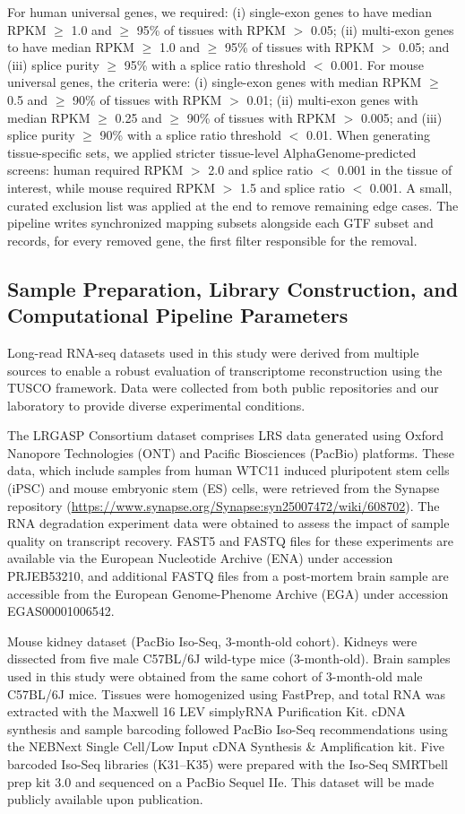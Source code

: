 \documentclass[pdflatex,sn-nature]{sn-jnl}%
\begin{document}
For human universal genes, we required: (i) single-exon genes to have median RPKM $\geq$ 1.0 and $\geq$ 95\% of tissues with RPKM $>$ 0.05; (ii) multi-exon genes to have median RPKM $\geq$ 1.0 and $\geq$ 95\% of tissues with RPKM $>$ 0.05; and (iii) splice purity $\geq$ 95\% with a splice ratio threshold $<$ 0.001. For mouse universal genes, the criteria were: (i) single-exon genes with median RPKM $\geq$ 0.5 and $\geq$ 90\% of tissues with RPKM $>$ 0.01; (ii) multi-exon genes with median RPKM $\geq$ 0.25 and $\geq$ 90\% of tissues with RPKM $>$ 0.005; and (iii) splice purity $\geq$ 90\% with a splice ratio threshold $<$ 0.01. When generating tissue-specific sets, we applied stricter tissue-level AlphaGenome-predicted screens: human required RPKM $>$ 2.0 and splice ratio $<$ 0.001 in the tissue of interest, while mouse required RPKM $>$ 1.5 and splice ratio $<$ 0.001. A small, curated exclusion list was applied at the end to remove remaining edge cases. The pipeline writes synchronized mapping subsets alongside each GTF subset and records, for every removed gene, the first filter responsible for the removal.

\subsection{Sample Preparation, Library Construction, and Computational Pipeline Parameters}

Long-read RNA-seq datasets used in this study were derived from multiple sources to enable a robust evaluation of transcriptome reconstruction using the TUSCO framework. Data were collected from both public repositories and our laboratory to provide diverse experimental conditions.

The LRGASP Consortium dataset comprises LRS data generated using Oxford Nanopore Technologies (ONT) and Pacific Biosciences (PacBio) platforms. These data, which include samples from human WTC11 induced pluripotent stem cells (iPSC) and mouse embryonic stem (ES) cells, were retrieved from the Synapse repository (\url{https://www.synapse.org/Synapse:syn25007472/wiki/608702}). The RNA degradation experiment data were obtained to assess the impact of sample quality on transcript recovery. FAST5 and FASTQ files for these experiments are available via the European Nucleotide Archive (ENA) under accession PRJEB53210, and additional FASTQ files from a post-mortem brain sample are accessible from the European Genome-Phenome Archive (EGA) under accession EGAS00001006542.

Mouse kidney dataset (PacBio Iso-Seq, 3-month-old cohort). Kidneys were dissected from five male C57BL/6J wild-type mice (3-month-old). Brain samples used in this study were obtained from the same cohort of 3-month-old male C57BL/6J mice. Tissues were homogenized using FastPrep, and total RNA was extracted with the Maxwell 16 LEV simplyRNA Purification Kit. cDNA synthesis and sample barcoding followed PacBio Iso-Seq recommendations using the NEBNext Single Cell/Low Input cDNA Synthesis \& Amplification kit. Five barcoded Iso-Seq libraries (K31--K35) were prepared with the Iso-Seq SMRTbell prep kit 3.0 and sequenced on a PacBio Sequel IIe. This dataset will be made publicly available upon publication.
\end{document}
